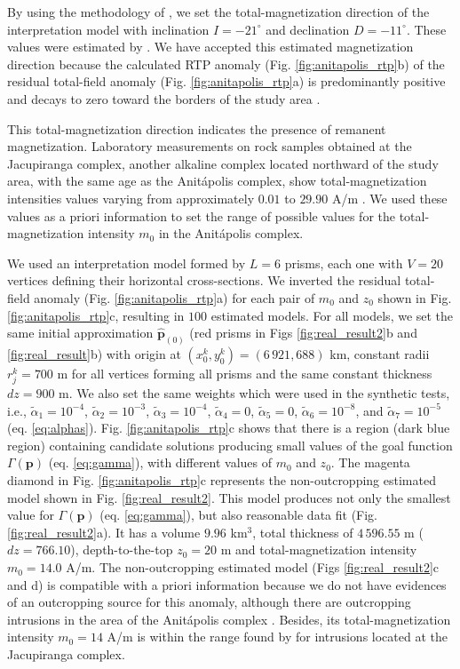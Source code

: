By using the methodology of \cite{reis-etal2020}, we set the total-magnetization direction of the interpretation model with inclination $ I=-21^\circ $ and declination $ D=-11^\circ $. These values were estimated by \cite{reis-seg-2019}. 
We have accepted this estimated magnetization direction because the calculated RTP anomaly 
(Fig. \ref{fig:anitapolis_rtp}b) of the residual total-field anomaly 
(Fig. \ref{fig:anitapolis_rtp}a) is predominantly positive and decays to zero toward
the borders of the study area \citep{reis-etal2020, reis-seg-2019}.

This total-magnetization direction indicates the presence of remanent magnetization.
Laboratory measurements on rock samples obtained at the Jacupiranga complex,
another alkaline complex located northward of the study area, 
with the same age as the Anit{\'a}polis complex, 
show total-magnetization intensities values varying from approximately 
$0.01$ to $29.90$ A/m \citep[][ tb. 1]{valdivia-2009}.
We used these values as a priori information to set the range of possible values 
for the total-magnetization intensity $m_{0}$ in the Anit{\'a}polis complex.

We used an interpretation model formed by $L = 6$ prisms, each one with 
$V = 20$ vertices defining their horizontal cross-sections.
We inverted the residual total-field anomaly (Fig. \ref{fig:anitapolis_rtp}a) for each 
pair of $m_0$ and $z_0$ shown in Fig. \ref{fig:anitapolis_rtp}c, resulting in $100$ estimated 
models. 
For all models, we set the same initial approximation $\hat{\mathbf{p}}_{(0)}$ 
(red prisms in Figs \ref{fig:real_result2}b and \ref{fig:real_result}b) 
with origin at $(x_0^k, y_0^k) = (6\,921, 688)$ km, constant radii $r_j^k = 700$ m for 
all vertices forming all prisms and the same constant thickness $dz = 900$ m.
We also set the same weights which were used in the synthetic tests, i.e., 
$\tilde{\alpha}_1 = 10^{-4}$, 
$\tilde{\alpha}_2 = 10^{-3}$, 
$\tilde{\alpha}_3 = 10^{-4}$, 
$\tilde{\alpha}_4 = 0$, 
$\tilde{\alpha}_5 = 0$, 
$\tilde{\alpha}_6 = 10^{-8}$, and 
$\tilde{\alpha}_7 = 10^{-5}$ (eq. \ref{eq:alphas}). 
Fig. \ref{fig:anitapolis_rtp}c shows that there is a region (dark blue region) containing 
candidate solutions producing small values of the goal function 
$\Gamma(\mathbf{p})$ (eq. \ref{eq:gamma}), with different values of $m_0$ and $z_0$.
The magenta diamond in Fig. \ref{fig:anitapolis_rtp}c represents the 
non-outcropping estimated model shown in Fig. \ref{fig:real_result2}. 
This model produces not only the smallest value for $ \Gamma(\mathbf{p}) $ (eq. \ref{eq:gamma}), but also reasonable data fit (Fig. \ref{fig:real_result2}a). 
It has a volume $ 9.96 $ km$ ^3 $, total thickness of $ 4\,596.55 $ m 
($ dz = 766.10 $), depth-to-the-top $z_0 = 20$ m and total-magnetization intensity 
$m_0 = 14.0$ A/m.
The non-outcropping estimated model (Figs \ref{fig:real_result2}c and d) 
is compatible with a priori information because 
we do not have evidences of an outcropping source for this anomaly, 
although there are outcropping intrusions in the area of the Anit{\'a}polis 
complex \cite[]{gibson-1999}.
Besides, its total-magnetization intensity $m_0 = 14$ A/m is within the range found by 
\citet{valdivia-2009} for intrusions located at the Jacupiranga complex.

